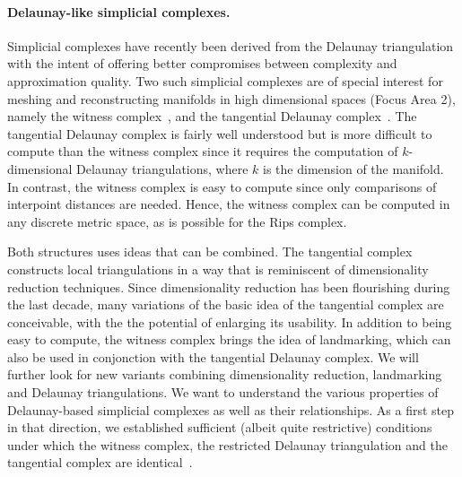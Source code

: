 \paragraph{Delaunay-like  simplicial complexes.} 
Simplicial complexes have recently been derived from the Delaunay
triangulation with the intent of offering better compromises between
complexity and approximation quality. Two such simplicial complexes are 
of special
interest for meshing and reconstructing manifolds in high dimensional spaces (Focus Area 2), namely
 the witness
complex~\cite{cds-tewc-2004}, and the tangential Delaunay
complex~\cite{geometrica-7142i}.
The
tangential Delaunay complex is fairly well understood but is more
difficult to compute than the witness complex since it requires the
computation of $k$-dimensional Delaunay triangulations, where $k$ is
the dimension of the manifold.  In contrast, the witness complex is
easy to compute since only comparisons of interpoint distances are
needed. Hence, the witness complex can be computed in any discrete
metric space, as is possible for the Rips complex. %

 Both structures uses ideas that can be combined. The tangential complex constructs local triangulations in a way that is reminiscent of dimensionality reduction techniques. Since dimensionality reduction has been flourishing during the last decade, many variations of the basic idea of the tangential complex are conceivable, with the the potential of enlarging its usability. In addition to being easy to compute, the witness complex brings the idea of landmarking, which can also be used in conjonction with the tangential Delaunay complex. We will further look for new
variants combining dimensionality reduction, landmarking and Delaunay triangulations. 
%
We want to understand the various properties of Delaunay-based simplicial complexes as well as their relationships. As a  first step in that direction, we established sufficient (albeit quite restrictive) conditions under which the witness complex, the restricted Delaunay triangulation and the tangential complex are identical~\cite{boissonnat2012stab}.

